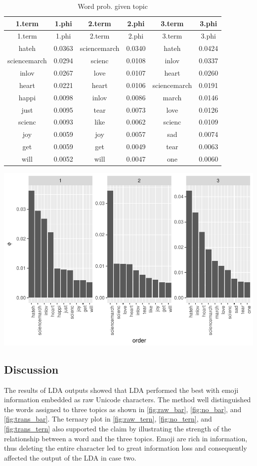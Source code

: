 \documentclass[]{article}
\begin{document}
\begin{longtable}[]{@{}cccccc@{}}
\caption{\label{tab:LDA_Tp} Word prob. given topic}\tabularnewline
\toprule
1.term & 1.phi & 2.term & 2.phi & 3.term & 3.phi\tabularnewline
\midrule
\endfirsthead
\toprule
1.term & 1.phi & 2.term & 2.phi & 3.term & 3.phi\tabularnewline
\midrule
\endhead
hateh & 0.0363 & sciencemarch & 0.0340 & hateh & 0.0424\tabularnewline
sciencemarch & 0.0294 & scienc & 0.0108 & inlov & 0.0337\tabularnewline
inlov & 0.0267 & love & 0.0107 & heart & 0.0260\tabularnewline
heart & 0.0221 & heart & 0.0106 & sciencemarch & 0.0191\tabularnewline
happi & 0.0098 & inlov & 0.0086 & march & 0.0146\tabularnewline
just & 0.0095 & tear & 0.0073 & love & 0.0126\tabularnewline
scienc & 0.0093 & like & 0.0062 & scienc & 0.0109\tabularnewline
joy & 0.0059 & joy & 0.0057 & sad & 0.0074\tabularnewline
get & 0.0059 & get & 0.0049 & tear & 0.0063\tabularnewline
will & 0.0052 & will & 0.0047 & one & 0.0060\tabularnewline
\bottomrule
\end{longtable}

\includegraphics{CC_paper_files/figure-latex/unnamed-chunk-6-1.pdf}

\subsection{Discussion}\label{discussion}

The results of LDA outputs showed that LDA performed the best with emoji
information embedded as raw Unicode characters. The method well
distinguished the words assigned to three topics as shown in
\autoref{fig:raw_bar}, \autoref{fig:no_bar}, and
\autoref{fig:trans_bar}. The ternary plot in \autoref{fig:raw_tern},
\autoref{fig:no_tern}, and \autoref{fig:trans_tern} also supported the
claim by illustrating the strength of the relationship between a word
and the three topics. Emoji are rich in information, thus deleting the
entire character led to great information loss and consequently affected
the output of the LDA in case two.
\end{document}
